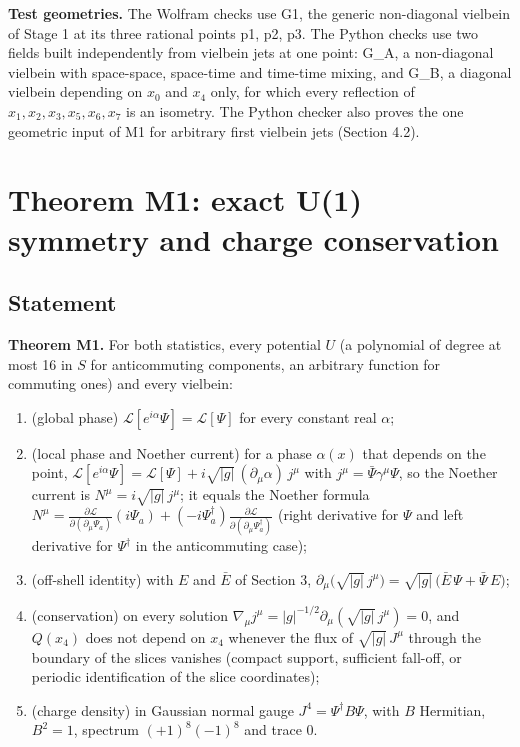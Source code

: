 \documentclass[11pt]{article}
\begin{document}
\textbf{Test geometries.} The Wolfram checks use G1, the generic non-diagonal vielbein of Stage 1 at its three rational points p1, p2, p3. The Python checks use two fields built independently from vielbein jets at one point: G\_A, a non-diagonal vielbein with space-space, space-time and time-time mixing, and G\_B, a diagonal vielbein depending on $x_0$ and $x_4$ only, for which every reflection of $x_1,x_2,x_3,x_5,x_6,x_7$ is an isometry. The Python checker also proves the one geometric input of M1 for arbitrary first vielbein jets (Section 4.2).

\section{Theorem M1: exact U(1) symmetry and charge conservation}

\subsection{Statement}

\textbf{Theorem M1.} For both statistics, every potential $U$ (a polynomial of degree at most 16 in $S$ for anticommuting components, an arbitrary function for commuting ones) and every vielbein:

\begin{enumerate}
\item (global phase) $\mathcal L[e^{i\alpha}\Psi]=\mathcal L[\Psi]$ for every constant real $\alpha$;
\item (local phase and Noether current) for a phase $\alpha(x)$ that depends on the point, $\mathcal L[e^{i\alpha}\Psi]=\mathcal L[\Psi]+i\sqrt{|g|}\,(\partial_\mu\alpha)\,j^\mu$ with $j^\mu=\bar\Psi\gamma^\mu\Psi$, so the Noether current is $N^\mu=i\sqrt{|g|}\,j^\mu$; it equals the Noether formula $N^\mu=\frac{\partial\mathcal L}{\partial(\partial_\mu\Psi_a)}(i\Psi_a)+(-i\Psi^\dagger_a)\frac{\partial\mathcal L}{\partial(\partial_\mu\Psi^\dagger_a)}$ (right derivative for $\Psi$ and left derivative for $\Psi^\dagger$ in the anticommuting case);
\item (off-shell identity) with $E$ and $\bar E$ of Section 3, $\partial_\mu\bigl(\sqrt{|g|}\,j^\mu\bigr)=\sqrt{|g|}\,\bigl(\bar E\,\Psi+\bar\Psi\,E\bigr)$;
\item (conservation) on every solution $\nabla_\mu j^\mu=|g|^{-1/2}\partial_\mu(\sqrt{|g|}\,j^\mu)=0$, and $Q(x_4)$ does not depend on $x_4$ whenever the flux of $\sqrt{|g|}\,J^\mu$ through the boundary of the slices vanishes (compact support, sufficient fall-off, or periodic identification of the slice coordinates);
\item (charge density) in Gaussian normal gauge $J^4=\Psi^\dagger B\Psi$, with $B$ Hermitian, $B^2=1$, spectrum $(+1)^8(-1)^8$ and trace 0.
\end{enumerate}
\end{document}

